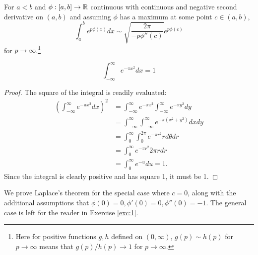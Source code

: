 \documentclass{mathnotes}
\begin{document}
\begin{thm}[Laplace, 1774]
    For $a<b$ and $\phi:[a,b]\to\mathbb{R}$ continuous with continuous and negative second derivative on $(a,b)$
    and assuming $\phi$ has a maximum at some point $c\in(a,b)$,
    \begin{equation}
        \int_a^be^{p\phi(x)}dx\sim\sqrt{\frac{2\pi}{-p\phi''(c)}}e^{p\phi(c)}
        \label{eq:lap2}
    \end{equation}
    for $p\to \infty$.\footnote{Here for positive functions $g,h$ defined on $(0,\infty)$, $g(p)\sim h(p)$ for
    $p\to\infty$ means that $g(p)/h(p)\to 1$ for $p\to\infty$.}
    \label{thm:lap1}
\end{thm}

\begin{lem}
    \begin{equation}
        \int_{-\infty}^\infty e^{-\pi x^2}dx = 1
        \label{eq:erf}
    \end{equation}
\end{lem}
\begin{proof}
    The square of the integral is readily evaluated:
    \begin{align*}
        \left( \int_{-\infty}^\infty e^{-\pi x^2}dx \right)^2 &= \int_{-\infty}^{\infty} e^{-\pi x^2}\int_{-\infty}^{\infty} e^{-\pi y^2}dy\\
        &=\int_{-\infty}^\infty\int_{-\infty}^\infty e^{-\pi(x^2+y^2)} dxdy\\
        &=\int_0^\infty\int_0^{2\pi}e^{-\pi r^2}rd\theta dr\\
        &=\int_0^\infty e^{-\pi r^2}2\pi rdr\\
        &=\int_0^\infty e^{-u}du=1.
    \end{align*}
    Since the integral is clearly positive and has square 1, it must be 1.
\end{proof}

We prove Laplace's theorem for the special case where $c=0$, along with the additional assumptions that
$\phi(0)=0,\phi'(0)=0,\phi''(0)=-1$. The general case is left for the reader in Exercise \ref{exc:1}.
\end{document}
